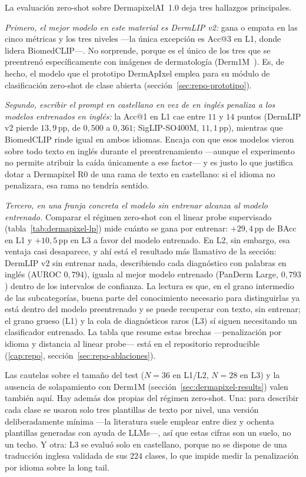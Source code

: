 La evaluación zero-shot sobre DermapixelAI~1.0 deja tres
hallazgos principales.

\textit{Primero, el mejor modelo en este material es DermLIP v2:} gana o
empata en las cinco métricas y los tres niveles ---la única excepción es
Acc@3 en L1, donde lidera BiomedCLIP---. No sorprende, porque es el único
de los tres que se preentrenó específicamente con imágenes de
dermatología (Derm1M~\cite{derm1m}). Es, de hecho, el modelo que el
prototipo DermApIxel emplea para su módulo de clasificación zero-shot de
clase abierta (sección~\ref{sec:repo-prototipo}).

\textit{Segundo, escribir el \emph{prompt} en castellano en vez de en
inglés penaliza a los modelos entrenados en inglés:} la Acc@1 en L1 cae
entre $11$ y $14$ puntos (DermLIP v2 pierde $13{,}9$\,pp, de $0{,}500$ a
$0{,}361$; SigLIP-SO400M, $11{,}1$\,pp), mientras que BiomedCLIP rinde
igual en ambos idiomas. Encaja con que esos modelos vieron sobre todo
texto en inglés durante el preentrenamiento ---aunque el experimento no
permite atribuir la caída únicamente a ese factor--- y es justo lo que
justifica dotar a Dermapixel R0 de una rama de texto en castellano: si el
idioma no penalizara, esa rama no tendría sentido.

\textit{Tercero, en una franja concreta el modelo sin entrenar alcanza al
modelo entrenado.} Comparar el régimen zero-shot con el linear probe
supervisado (tabla~\ref{tab:dermapixel-lp}) mide cuánto se gana por
entrenar: $+29{,}4$\,pp de BAcc en L1 y $+10{,}5$\,pp en L3 a favor del
modelo entrenado. En L2, sin embargo, esa ventaja casi desaparece, y ahí
está el resultado más llamativo de la sección: DermLIP v2 sin entrenar
nada, describiendo cada diagnóstico con palabras en inglés (AUROC
$0{,}794$), iguala al mejor modelo entrenado (PanDerm Large, $0{,}793$)
dentro de los intervalos de confianza. La lectura es que, en el grano
intermedio de las subcategorías, buena parte del conocimiento necesario
para distinguirlas ya está dentro del modelo preentrenado y se puede
recuperar con texto, sin entrenar; el grano grueso (L1) y la cola de
diagnósticos raros (L3) sí siguen necesitando un clasificador entrenado.
La tabla que resume estas brechas ---penalización por idioma y distancia
al linear probe--- está en el repositorio reproducible (\ref{cap:repo},
sección~\ref{sec:repo-ablaciones}).

Las cautelas sobre el tamaño del test ($N = 36$ en L1/L2, $N = 28$ en L3)
y la ausencia de solapamiento con Derm1M
(sección~\ref{sec:dermapixel-results}) valen también aquí. Hay además dos
propias del régimen zero-shot. Una: para describir cada clase se usaron
solo tres plantillas de texto por nivel, una versión deliberadamente
mínima ---la literatura suele emplear entre diez y ochenta plantillas
generadas con ayuda de LLMs---, así que estas cifras son un suelo, no un
techo. Y otra: L3 se evaluó solo en castellano, porque no se dispone de
una traducción inglesa validada de sus $224$ clases, lo que impide medir
la penalización por idioma sobre la long tail.

